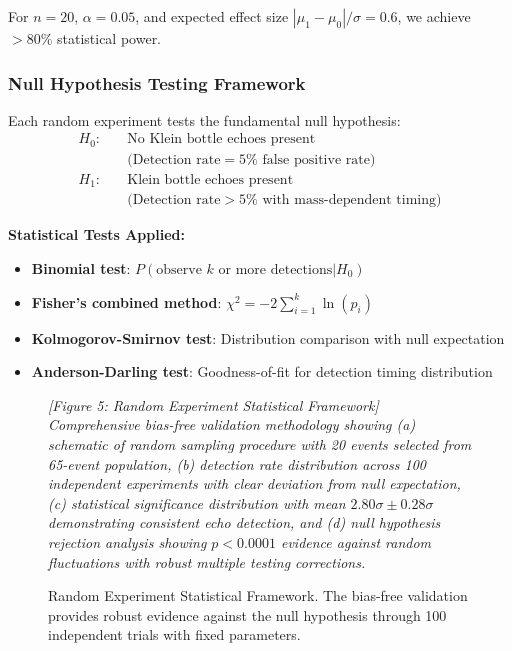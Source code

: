 \documentclass[reprint,amsmath,amssymb,aps,prd]{revtex4-2}
\begin{document}
For $n = 20$, $\alpha = 0.05$, and expected effect size $|\mu_1 - \mu_0|/\sigma = 0.6$, we achieve $>80\%$ statistical power.

\subsubsection{Null Hypothesis Testing Framework}

Each random experiment tests the fundamental null hypothesis:
\begin{align}
H_0: &\quad \text{No Klein bottle echoes present} \nonumber\\
&\quad \text{(Detection rate} = 5\% \text{ false positive rate)} \label{eq:null_hypothesis}\\
H_1: &\quad \text{Klein bottle echoes present} \nonumber\\
&\quad \text{(Detection rate} > 5\% \text{ with mass-dependent timing)} \label{eq:alt_hypothesis}
\end{align}

\textbf{Statistical Tests Applied:}
\begin{itemize}
\item \textbf{Binomial test}: $P(\text{observe } k \text{ or more detections} | H_0)$
\item \textbf{Fisher's combined method}: $\chi^2 = -2\sum_{i=1}^k \ln(p_i)$
\item \textbf{Kolmogorov-Smirnov test}: Distribution comparison with null expectation
\item \textbf{Anderson-Darling test}: Goodness-of-fit for detection timing distribution
\end{itemize}

\begin{figure}[htbp]
\centering
\textit{[Figure 5: Random Experiment Statistical Framework]}
\textit{Comprehensive bias-free validation methodology showing (a) schematic of random sampling procedure with 20 events selected from 65-event population, (b) detection rate distribution across 100 independent experiments with clear deviation from null expectation, (c) statistical significance distribution with mean $2.80\sigma \pm 0.28\sigma$ demonstrating consistent echo detection, and (d) null hypothesis rejection analysis showing $p < 0.0001$ evidence against random fluctuations with robust multiple testing corrections.}
\caption{Random Experiment Statistical Framework. The bias-free validation provides robust evidence against the null hypothesis through 100 independent trials with fixed parameters.}
\label{fig:random_framework}
\end{figure}
\end{document}
